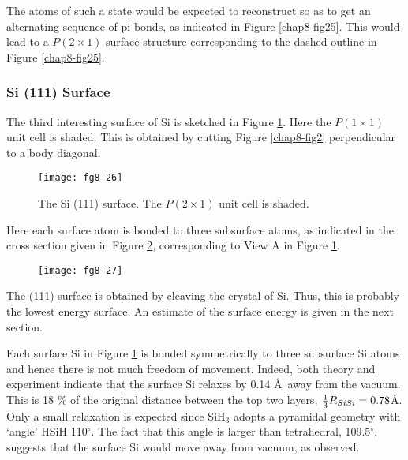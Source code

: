 The atoms of such a state would be expected to reconstruct so as to
get an alternating sequence of pi bonds, as indicated in Figure
\ref{chap8-fig25}.  This would lead to a $P(2 \times 1)$ surface
structure corresponding to the dashed outline in Figure \ref{chap8-fig25}.

\subsubsection{Si (111) Surface}

The third interesting surface of Si is sketched in Figure
\ref{chap8-fig26}.  Here the $P(1 \times 1)$ unit cell is shaded.
This is obtained by cutting Figure \ref{chap8-fig2} perpendicular to a
body diagonal.

\begin{figure}
\begin{center}
\texttt{[image: fg8-26]}
\end{center}
\caption{The Si (111) surface. The $P(2\times 1)$ unit cell is shaded.}
\label{chap8-fig26}
\end{figure}

Here each surface atom is bonded to three subsurface atoms, as
indicated in the cross section given in Figure \ref{chap8-fig27},
corresponding to View A in Figure \ref{chap8-fig26}.

\begin{figure}
\begin{center}
\texttt{[image: fg8-27]}
\end{center}
\caption{}
\label{chap8-fig27}
\end{figure}

The (111) surface is obtained by cleaving the crystal of Si.  Thus, this is 
probably the lowest energy surface.  An estimate of the surface energy is 
given in the next section.

Each surface Si in Figure \ref{chap8-fig26} is bonded symmetrically to
three subsurface Si atoms and hence there is not much freedom of
movement.  Indeed, both theory and experiment indicate that the
surface Si relaxes by 0.14 \AA\ away from the vacuum.  This is 18
\% of the original distance between the top two layers, ${1 \over
3} R_{SiSi} = 0.78$\AA.  Only a small relaxation is expected since
SiH$_3$ adopts a pyramidal geometry with `angle' HSiH 110$^{\circ}$.
The fact that this angle is larger than tetrahedral, 109.5$^{\circ}$,
suggests that the surface Si would move away from vacuum, as observed.

